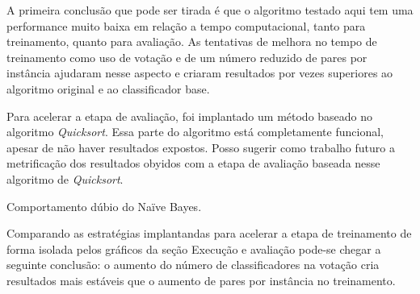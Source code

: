 A primeira conclusão que pode ser tirada é que o algoritmo testado aqui tem uma performance muito baixa em relação a tempo computacional, tanto para treinamento, quanto para avaliação. As tentativas de melhora no tempo de treinamento como uso de votação e de um número reduzido de pares por instância ajudaram nesse aspecto e criaram resultados por vezes superiores ao algoritmo original e ao classificador base.

Para acelerar a etapa de avaliação, foi implantado um método baseado no algoritmo \emph{Quicksort}. Essa parte do algoritmo está completamente funcional, apesar de não haver resultados expostos. Posso sugerir como trabalho futuro a metrificação dos resultados obyidos com a etapa de avaliação baseada nesse algoritmo de \emph{Quicksort}.

Comportamento dúbio do Naïve Bayes.

Comparando as estratégias implantandas para acelerar a etapa de treinamento de forma isolada pelos gráficos da seção {{Execução e avaliação}} pode-se chegar a seguinte conclusão: o aumento do número de classificadores na votação cria resultados mais estáveis que o aumento de pares por instância no treinamento.
